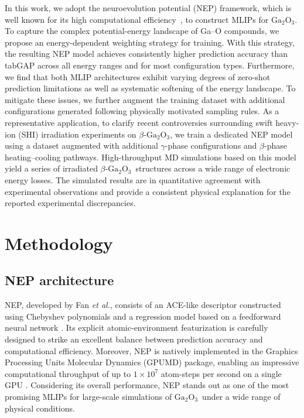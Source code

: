 \documentclass[%
reprint,
superscriptaddress,
 amsmath,amssymb,
 aps,
]{revtex4-2}
\newcommand{\ga}{$\text{Ga}_2\text{O}_3$}
\begin{document}
In this work, we adopt the neuroevolution potential (NEP) framework, which is well known
for its high computational efficiency~\cite{xu_gpumd_2025}, to construct MLIPs for \ga.
To capture the complex potential-energy landscape of Ga--O compounds, we propose an
energy-dependent weighting strategy for training.
With this strategy, the resulting NEP model achieves consistently higher prediction
accuracy than tabGAP across all energy ranges and for most configuration types.
Furthermore, we find that both MLIP architectures exhibit varying degrees of zero-shot
prediction limitations as well as systematic softening of the energy landscape.
To mitigate these issues, we further augment the training dataset with additional
configurations generated following physically motivated sampling rules.
As a representative application, to clarify recent controversies surrounding swift heavy-ion (SHI) 
irradiation experiments on $\beta$-\ga, we train a dedicated NEP model using a
dataset augmented with additional $\gamma$-phase configurations and $\beta$-phase
heating--cooling pathways.
High-throughput MD simulations based on this model yield a series of irradiated
$\beta$-\ga\ structures across a wide range of electronic energy losses.
The simulated results are in quantitative agreement with experimental observations and
provide a consistent physical explanation for the reported experimental discrepancies.

\section{Methodology}

\subsection{NEP architecture}

NEP, developed by Fan \textit{et al.}, consists of an ACE-like descriptor constructed using 
Chebyshev polynomials and a regression model based on 
a feedforward neural network \cite{fan_neuroevolution_2021,fan_gpumd_2022,song_general-purpose_2024}. 
Its explicit atomic-environment featurization is carefully designed to strike an excellent 
balance between prediction accuracy and computational efficiency. 
Moreover, NEP is natively implemented in the Graphics Processing Units Molecular Dynamics 
(GPUMD) package, enabling an impressive computational throughput of up to $1\times10^{7}$ 
atom-steps per second on a single GPU \cite{xu_gpumd_2025}. 
Considering its overall performance, NEP stands out as one of the most promising 
MLIPs for large-scale simulations of \ga\ under a wide range of physical conditions.
\end{document}
